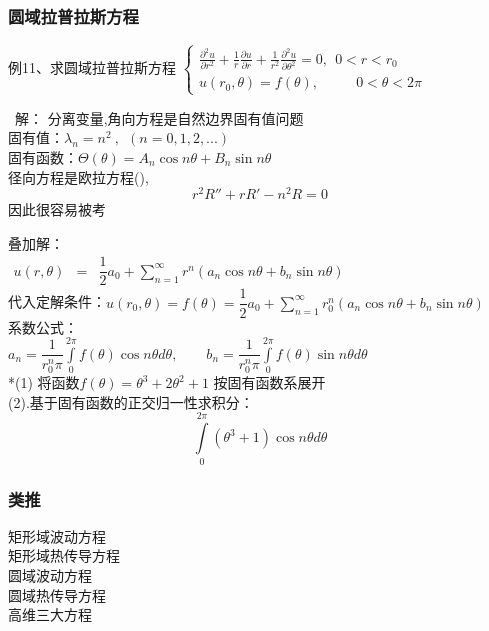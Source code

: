 \begin{frame}
	\frametitle{圆域拉普拉斯方程}	
	\begin{exampleblock} {例11、求圆域拉普拉斯方程}
        { $  \displaystyle  \left \{ 
        \begin{array}{cc}
            \displaystyle {	\frac{\partial^2 u }{\partial r^2 } +\frac{1}{r } \frac{\partial u }{\partial r } +
                \frac{1}{r^2 } \frac{\partial ^2 u }{\partial \theta ^2
            } } =0, ~~ 0<r<r_0\\
            u(r_0,\theta )=f(\theta ) ,~~~~~~~~~~~~ 0<\theta <2\pi 
        \end{array}
        \right. $}  
        \end{exampleblock}	
        \alert{ 解：}	分离变量,角向方程是自然边界固有值问题 \\	
        固有值：$\lambda _n =n^2 ~,~~ (n=0,1,2,...)$  \\ 
        固有函数：$\displaystyle  \Theta(\theta)=A_n\cos n \theta +B_n \sin n \theta $\\   \vspace{0.6cm}	
        径向方程是欧拉方程({\color{red}{[例4]}}),
	    \[   r^2 R'' +r R' -n^2 R =0  \]
	    因此很容易被考
\end{frame}	

\begin{frame}	
	叠加解：\\ 
	$\begin{array}{llll}
		u(r, \theta) &=& \dfrac{1}{2} a_0 +\sum\limits_{n=1}^{\infty }r^n  (a_n \cos n\theta +b_n \sin n \theta ) 
	\end{array}$ \\ 
	代入定解条件：$ u(r_0,\theta)=f (\theta) =\dfrac{1}{2} a_0 +\sum\limits_{n=1}^{\infty }r_0^n  (a_n\cos n\theta +b_n \sin n \theta ) $ \\ 
	系数公式：\\ 
	$  \displaystyle  a_n = \dfrac{1}{r_0 ^n \pi }  \int\limits_{0}^{2\pi} f(\theta) \cos n \theta d\theta, \qquad  b_n = \dfrac{1}{r_0 ^n \pi }  \int\limits_{0}^{2\pi} f(\theta) \sin n \theta d\theta $  \\ 

    *(1) 将函数$f(\theta)=\theta^3+2\theta^2 +1$ 按固有函数系展开 \\
    (2).基于固有函数的正交归一性求积分：
  \[ \int\limits_{0}^{2\pi} (\theta^3 +1)\cos n \theta d\theta \]	
\end{frame}	

\begin{frame}
        \frametitle{类推}
        {\color{red}{[X]}} 矩形域波动方程\\
        {\color{red}{[X]}} 矩形域热传导方程\\
        {\color{red}{[X]}} 圆域波动方程\\
        {\color{red}{[X]}} 圆域热传导方程\\
        {\color{red}{[X]}} 高维三大方程\\
\end{frame}

